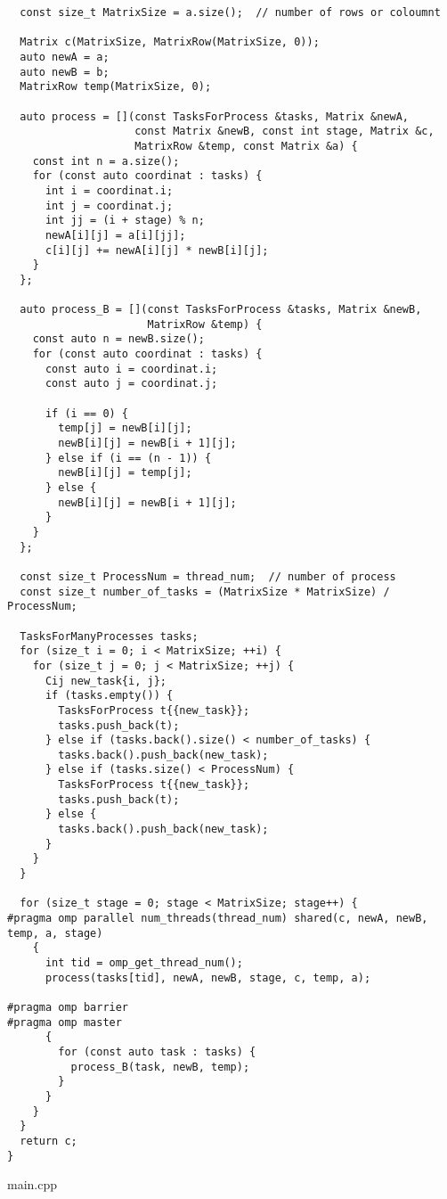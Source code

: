 \documentclass{report}
\begin{document}
\begin{lstlisting}
  const size_t MatrixSize = a.size();  // number of rows or coloumnt

  Matrix c(MatrixSize, MatrixRow(MatrixSize, 0));
  auto newA = a;
  auto newB = b;
  MatrixRow temp(MatrixSize, 0);

  auto process = [](const TasksForProcess &tasks, Matrix &newA,
                    const Matrix &newB, const int stage, Matrix &c,
                    MatrixRow &temp, const Matrix &a) {
    const int n = a.size();
    for (const auto coordinat : tasks) {
      int i = coordinat.i;
      int j = coordinat.j;
      int jj = (i + stage) % n;
      newA[i][j] = a[i][jj];
      c[i][j] += newA[i][j] * newB[i][j];
    }
  };

  auto process_B = [](const TasksForProcess &tasks, Matrix &newB,
                      MatrixRow &temp) {
    const auto n = newB.size();
    for (const auto coordinat : tasks) {
      const auto i = coordinat.i;
      const auto j = coordinat.j;

      if (i == 0) {
        temp[j] = newB[i][j];
        newB[i][j] = newB[i + 1][j];
      } else if (i == (n - 1)) {
        newB[i][j] = temp[j];
      } else {
        newB[i][j] = newB[i + 1][j];
      }
    }
  };

  const size_t ProcessNum = thread_num;  // number of process
  const size_t number_of_tasks = (MatrixSize * MatrixSize) / ProcessNum;

  TasksForManyProcesses tasks;
  for (size_t i = 0; i < MatrixSize; ++i) {
    for (size_t j = 0; j < MatrixSize; ++j) {
      Cij new_task{i, j};
      if (tasks.empty()) {
        TasksForProcess t{{new_task}};
        tasks.push_back(t);
      } else if (tasks.back().size() < number_of_tasks) {
        tasks.back().push_back(new_task);
      } else if (tasks.size() < ProcessNum) {
        TasksForProcess t{{new_task}};
        tasks.push_back(t);
      } else {
        tasks.back().push_back(new_task);
      }
    }
  }

  for (size_t stage = 0; stage < MatrixSize; stage++) {
#pragma omp parallel num_threads(thread_num) shared(c, newA, newB, temp, a, stage)
    {
      int tid = omp_get_thread_num();
      process(tasks[tid], newA, newB, stage, c, temp, a);

#pragma omp barrier
#pragma omp master
      {
        for (const auto task : tasks) {
          process_B(task, newB, temp);
        }
      }
    }
  }
  return c;
}
 \end{lstlisting}
 main.cpp
\end{document}
